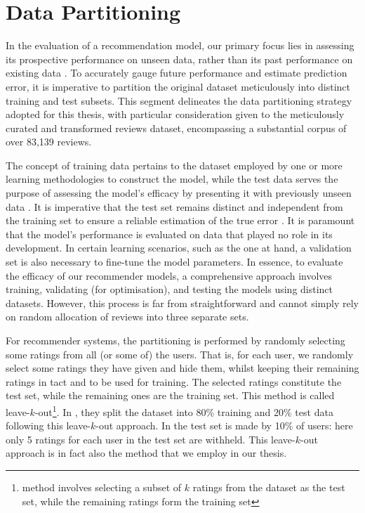 \section{Data Partitioning}
\label{sec:3 Data Partitioning}

In the evaluation of a recommendation model, our primary focus lies in assessing its prospective performance on unseen data, rather than its past performance on existing data \cite{witten2005practical}. To accurately gauge future performance and estimate prediction error, it is imperative to partition the original dataset meticulously into distinct training and test subsets. This segment delineates the data partitioning strategy adopted for this thesis, with particular consideration given to the meticulously curated and transformed reviews dataset, encompassing a substantial corpus of over 83,139 reviews.

The concept of training data pertains to the dataset employed by one or more learning methodologies to construct the model, while the test data serves the purpose of assessing the model's efficacy by presenting it with previously unseen data \cite{witten2005practical}. It is imperative that the test set remains distinct and independent from the training set to ensure a reliable estimation of the true error \cite{witten2005practical}. It is paramount that the model's performance is evaluated on data that played no role in its development. In certain learning scenarios, such as the one at hand, a validation set is also necessary to fine-tune the model parameters. In essence, to evaluate the efficacy of our recommender models, a comprehensive approach involves training, validating (for optimisation), and testing the models using distinct datasets. However, this process is far from straightforward and cannot simply rely on random allocation of reviews into three separate sets.

For recommender systems, the partitioning is performed by randomly selecting some ratings from all (or some of) the users. That is, for each user, we randomly select some ratings they have given and hide them, whilst keeping their remaining ratings in tact and to be used for training. The selected ratings constitute the test set, while the remaining ones are the training set. This method is called leave-$k$-out\footnote{method involves selecting a subset of $k$ ratings from the dataset as the test set, while the remaining ratings form the training set}. In \cite{sarwar2002incremental}, they split the dataset into 80\% training and 20\% test data following this leave-$k$-out approach. In \cite{herlocker1999algorithmic} the test set is made by 10\% of users: here only 5 ratings for each user in the test set are withheld. This leave-$k$-out approach is in fact also the method that we employ in our thesis. 

